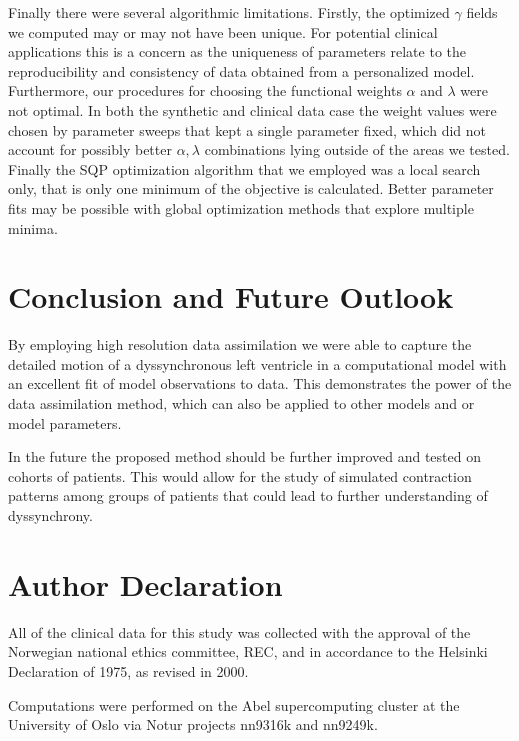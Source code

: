 Finally there were several algorithmic limitations. 
Firstly, the optimized $\gamma$ fields we computed may or may not have been unique.
For potential clinical applications this is a concern as the uniqueness of parameters
relate to the reproducibility and consistency of data obtained from a personalized
model. Furthermore, our procedures for
choosing the functional weights $\alpha$ and $\lambda$ were not optimal.
In both the synthetic
and clinical data case the weight values
were chosen by parameter sweeps that kept a single parameter fixed, which did not
account for possibly better $\alpha,\lambda$ combinations
lying outside of the areas we tested. 
Finally the SQP optimization algorithm that we employed 
was a local search only, that is only
one minimum of the objective is calculated. Better parameter fits may be possible
with global optimization methods that explore multiple minima.

\section{Conclusion and Future Outlook}
\label{sec:conclusion}
By employing high resolution data assimilation we
were able to capture the detailed motion of a dyssynchronous left
ventricle in a computational model with an excellent fit of model observations
to data. This demonstrates the power of the data assimilation method,
which can also be applied to other models and or model parameters.

In the future the proposed method should be further improved and 
tested on cohorts of patients. This would allow for the study of simulated contraction patterns 
among groups of patients that could lead to further understanding of
dyssynchrony.

\section{Author Declaration}
All of the clinical data for this study was collected with the approval of the Norwegian national ethics committee, REC,
and in accordance to the Helsinki Declaration of 1975, as revised in 2000.

Computations were performed on the Abel supercomputing cluster at the
University of Oslo via Notur projects nn9316k and nn9249k.

\appendix

